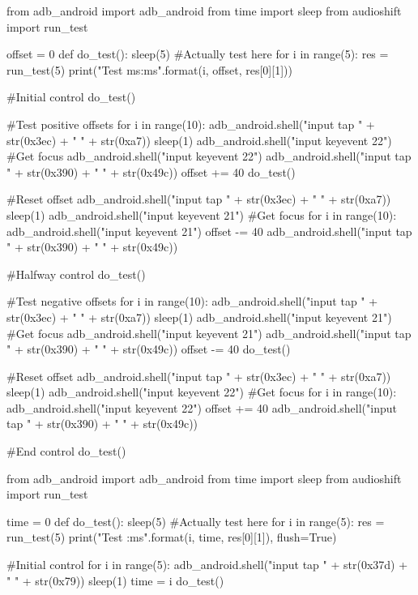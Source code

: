 \begin{mdframed}
    \begin{python}
from adb_android import adb_android
from time import sleep
from audioshift import run_test

offset = 0
def do_test():
    sleep(5)
    #Actually test here
    for i in range(5):
        res = run_test(5)
        print("Test {} {}ms:{}ms".format(i, offset, res[0][1]))

#Initial control
do_test()

#Test positive offsets
for i in range(10):
    adb_android.shell("input tap " + str(0x3ec) + " " + str(0xa7))
    sleep(1)
    adb_android.shell("input keyevent 22") #Get focus
    adb_android.shell("input keyevent 22")
    adb_android.shell("input tap " + str(0x390) + " " + str(0x49c))
    offset += 40
    do_test()

#Reset offset
adb_android.shell("input tap " + str(0x3ec) + " " + str(0xa7))
sleep(1)
adb_android.shell("input keyevent 21") #Get focus
for i in range(10):
    adb_android.shell("input keyevent 21")
    offset -= 40
adb_android.shell("input tap " + str(0x390) + " " + str(0x49c))

#Halfway control
do_test()

#Test negative offsets
for i in range(10):
    adb_android.shell("input tap " + str(0x3ec) + " " + str(0xa7))
    sleep(1)
    adb_android.shell("input keyevent 21") #Get focus
    adb_android.shell("input keyevent 21")
    adb_android.shell("input tap " + str(0x390) + " " + str(0x49c))
    offset -= 40
    do_test()

#Reset offset
adb_android.shell("input tap " + str(0x3ec) + " " + str(0xa7))
sleep(1)
adb_android.shell("input keyevent 22") #Get focus
for i in range(10):
    adb_android.shell("input keyevent 22")
    offset += 40
adb_android.shell("input tap " + str(0x390) + " " + str(0x49c))

#End control
do_test()
    \end{python}
\end{mdframed}
\clearpage

\begin{mdframed}
    \begin{python}
from adb_android import adb_android
from time import sleep
from audioshift import run_test

time = 0
def do_test():
    sleep(5)
    #Actually test here
    for i in range(5):
        res = run_test(5)
        print("Test {} {}:{}ms".format(i, time, res[0][1]), flush=True)

#Initial control
for i in range(5):
    adb_android.shell("input tap " + str(0x37d) + " " + str(0x79))
    sleep(1)
    time = i
    do_test()
    \end{python}
\end{mdframed}
\clearpage
